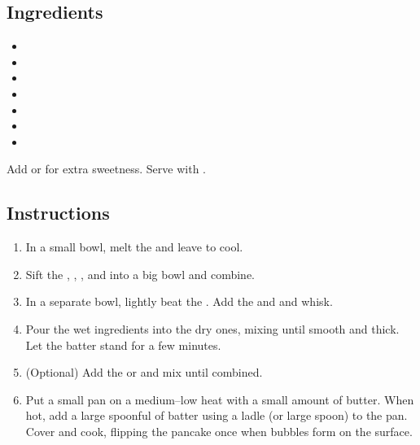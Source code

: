 \documentclass[12pt]{article}
\begin{document}
\recipetitle

\subsection*{Ingredients}

\begin{itemize}[nolistsep]
    \item {}
    \item {}
    \item {}
    \item {}
    \item {}
    \item {}
    \item {}
\end{itemize}

Add  or  for extra sweetness. Serve with .

\subsection*{Instructions}

\begin{enumerate}
    \item In a small bowl, melt the  and leave to cool.
    \item Sift the , , , and  into a big bowl and combine.
    \item In a separate bowl, lightly beat the . Add the  and  and whisk.
    \item Pour the wet ingredients into the dry ones, mixing until smooth and thick. Let the batter stand for a few minutes.
    \item (Optional) Add the  or  and mix until combined.
    \item Put a small pan on a medium--low heat with a small amount of butter. When hot, add a large spoonful of batter using a ladle (or large spoon) to the pan. Cover and cook, flipping the pancake once when bubbles form on the surface.
\end{enumerate}
\end{document}
